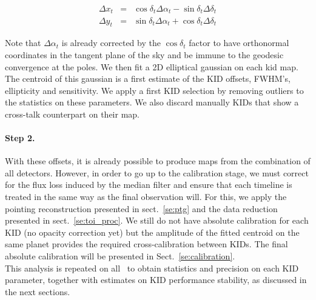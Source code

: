 \begin{eqnarray}
\Delta x_t &=& \cos\delta_t \Delta\alpha_t - \sin \delta_t\Delta \delta_t \nonumber \\
\Delta y_t &=& \sin\delta_t \Delta\alpha_t + \cos \delta_t\Delta \delta_t \nonumber
\end{eqnarray}

Note that $\Delta\alpha_t$ is already corrected by the $\cos\delta_t$ factor to
have orthonormal coordinates in the tangent plane of the sky and be immune to
the geodesic convergence at the poles. We then fit a 2D elliptical gaussian on
each kid map. The centroid of this gaussian is a first estimate of the KID
offsets, FWHM's, ellipticity and sensitivity. We apply a first KID selection by
removing outliers to the statistics on these parameters. We also discard
manually KIDs that show a cross-talk counterpart on their map.

\paragraph{Step 2.} With these offsets, it is already possible to produce maps
from the combination of all detectors. However, in order to go up to
the calibration stage, we must correct for the flux loss induced by
the median filter and ensure that each timeline is treated in the same
way as the final observation will. For this, we apply the pointing
reconstruction presented in sect.~\ref{se:ptg} and the data reduction
presented in sect.~\ref{se:toi_proc}. We still do not have absolute
calibration for each KID (no opacity correction yet) but the amplitude
of the fitted centroid on the same planet provides the required
cross-calibration between KIDs. The final absolute calibration will be
presented in Sect.~\ref{se:calibration}.\\

This analysis is repeated on all \bms\ to obtain statistics and
precision on each KID parameter, together with estimates on KID
performance stability, as discussed in the next sections.


